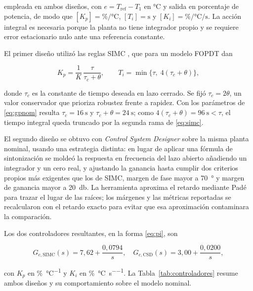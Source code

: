 \documentclass[conference,a4paper,10pt]{IEEEtran}
\newcommand{\Tref}{T_{\mathrm{ref}}}
\newcommand{\Kp}{K_p}
\newcommand{\Ki}{K_i}
\newcommand{\Ti}{T_i}
\begin{document}
empleada en ambos diseños, con $e = \Tref - T_1$ en \si{\celsius} y salida en porcentaje de
potencia, de modo que
$[\Kp] = \si{\percent\per\celsius}$, $[\Ti] = \si{\second}$ y
$[\Ki] = \si{\percent\per\celsius\per\second}$. La acción integral es necesaria porque la planta no
tiene integrador propio y se requiere error estacionario nulo ante una referencia constante.

El primer diseño utilizó las reglas SIMC \cite{skogestad2003}, que para un modelo FOPDT dan

\begin{equation}
\Kp = \frac{1}{K}\,\frac{\tau}{\tau_c + \theta},
\qquad
\Ti = \min\{\tau,\; 4(\tau_c + \theta)\},
\label{eq:simc}
\end{equation}

donde $\tau_c$ es la constante de tiempo deseada en lazo cerrado. Se fijó $\tau_c = 2\theta$, un
valor conservador que prioriza robustez frente a rapidez. Con los parámetros de \eqref{eq:gpnom}
resulta $\tau_c = \SI{16}{\second}$ y $\tau_c + \theta = \SI{24}{\second}$; como
$4(\tau_c+\theta) = \SI{96}{\second} < \tau$, el tiempo integral queda truncado por la segunda rama
de \eqref{eq:simc}.

El segundo diseño se obtuvo con \emph{Control System Designer} sobre la misma planta nominal,
usando una estrategia distinta: en lugar de aplicar una fórmula de sintonización se moldeó la
respuesta en frecuencia del lazo abierto añadiendo un integrador y un cero real, y ajustando la
ganancia hasta cumplir dos criterios propios más exigentes que los de SIMC, margen de fase mayor a
\SI{70}{\degree} y margen de ganancia mayor a \SI{20}{\decibel}. La herramienta aproxima el retardo
mediante Padé para trazar el lugar de las raíces; los márgenes y las métricas reportadas se
recalcularon con el retardo exacto para evitar que esa aproximación contaminara la comparación.

Los dos controladores resultantes, en la forma \eqref{eq:pi}, son

\begin{equation}
G_{c,\mathrm{SIMC}}(s) = 7{,}62 + \frac{0{,}0794}{s},
\quad
G_{c,\mathrm{CSD}}(s) = 3{,}00 + \frac{0{,}0200}{s},
\label{eq:gc}
\end{equation}

con $\Kp$ en \si{\percent\per\celsius} y $\Ki$ en \si{\percent\per\celsius\per\second}. La
Tabla~\ref{tab:controladores} resume ambos diseños y su comportamiento sobre el modelo nominal.
\end{document}
